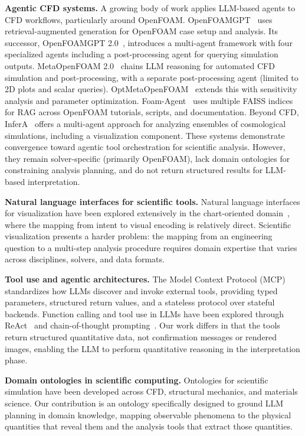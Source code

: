 \documentclass{vgtc}                          %
\begin{document}
\textbf{Agentic CFD systems.}
A growing body of work applies LLM-based agents to CFD workflows, particularly
around OpenFOAM.
OpenFOAMGPT~\cite{Pandey:2025:OFGPT} uses retrieval-augmented generation for
OpenFOAM case setup and analysis.
Its successor, OpenFOAMGPT 2.0~\cite{Feng:2025:OFGPT2}, introduces a
multi-agent framework with four specialized agents including a post-processing
agent for querying simulation outputs.
MetaOpenFOAM 2.0~\cite{Chen:2025:Meta} chains LLM reasoning for automated CFD
simulation and post-processing, with a separate post-processing agent (limited
to 2D plots and scalar queries).
OptMetaOpenFOAM~\cite{Chen:2025:Opt} extends this with sensitivity analysis and
parameter optimization.
Foam-Agent~\cite{Yue:2025:Foam} uses multiple FAISS indices for RAG across
OpenFOAM tutorials, scripts, and documentation.
Beyond CFD, InferA~\cite{Tam:2025:InferA} offers a multi-agent approach for
analyzing ensembles of cosmological simulations, including a visualization
component.
These systems demonstrate convergence toward agentic tool orchestration for
scientific analysis.
However, they remain solver-specific (primarily OpenFOAM), lack domain
ontologies for constraining analysis planning, and do not return structured
results for LLM-based interpretation.

\textbf{Natural language interfaces for scientific tools.}
Natural language interfaces for visualization have been explored extensively in
the chart-oriented domain~\cite{Luo:2022:NL2VIS,Li:2024:MatPlotAgent}, where the
mapping from intent to visual encoding is relatively direct.
Scientific visualization presents a harder problem: the mapping from an
engineering question to a multi-step analysis procedure requires domain
expertise that varies across disciplines, solvers, and data formats.

\textbf{Tool use and agentic architectures.}
The Model Context Protocol (MCP)~\cite{MCP:2024} standardizes how LLMs discover
and invoke external tools, providing typed parameters, structured return values,
and a stateless protocol over stateful backends.
Function calling and tool use in LLMs have been explored through
ReAct~\cite{Yao:2023:ReAct} and chain-of-thought
prompting~\cite{Wei:2022:CoT}.
Our work differs in that the tools return structured quantitative data, not
confirmation messages or rendered images, enabling the LLM to perform
quantitative reasoning in the interpretation phase.

\textbf{Domain ontologies in scientific computing.}
Ontologies for scientific simulation have been developed across
CFD, structural mechanics, and materials science.
Our contribution is an ontology specifically designed to ground LLM planning
in domain knowledge, mapping observable phenomena to the physical quantities
that reveal them and the analysis tools that extract those quantities.
\end{document}
